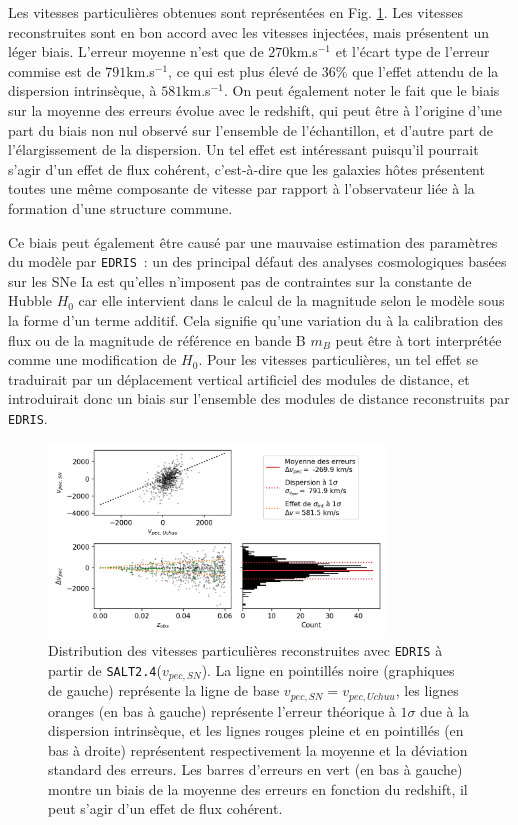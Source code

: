 \documentclass{book}
\def\edris{\texttt{EDRIS}\xspace}
\def\saltd{\texttt{SALT2.4}\xspace}
\begin{document}
Les vitesses particulières obtenues sont représentées en Fig. \ref{fig:vp_salt}. Les vitesses reconstruites sont en bon accord avec les vitesses injectées, mais présentent un léger biais. L'erreur moyenne n'est que de $270$km.s$^{-1}$ et l'écart type de l'erreur commise est de $791$km.s$^{-1}$, ce qui est plus élevé de 36\% que l'effet attendu de la dispersion intrinsèque, à $581$km.s$^{-1}$. On peut également noter le fait que le biais sur la moyenne des erreurs évolue avec le redshift, qui peut être à l'origine d'une part du biais non nul observé sur l'ensemble de l'échantillon, et d'autre part de l'élargissement de la dispersion. Un tel effet est intéressant puisqu'il pourrait s'agir d'un effet de flux cohérent, c'est-à-dire que les galaxies hôtes présentent toutes une même composante de vitesse par rapport à l'observateur liée à la formation d'une structure commune.

Ce biais peut également être causé par une mauvaise estimation des paramètres du modèle par \edris~: un des principal défaut des analyses cosmologiques basées sur les SNe Ia est qu'elles n'imposent pas de contraintes sur la constante de Hubble $H_0$ car elle intervient dans le calcul de la magnitude selon le modèle sous la forme d'un terme additif. Cela signifie qu'une variation du à la calibration des flux ou de la magnitude de référence en bande B $m_B$ peut être à tort interprétée comme une modification de $H_0$. Pour les vitesses particulières, un tel effet se traduirait par un déplacement vertical artificiel des modules de distance, et introduirait donc un biais sur l'ensemble des modules de distance reconstruits par \edris.

\begin{figure}
	\centering
	\includegraphics[width=0.8\textwidth]{figures/vp_salt.png}
	\caption{Distribution des vitesses particulières reconstruites avec \edris à partir de \saltd ($v_{pec,SN}$). La ligne en pointillés noire (graphiques de gauche) représente la ligne de base $v_{pec, SN} = v_{pec, Uchuu}$, les lignes oranges (en bas à gauche) représente l'erreur théorique à $1\sigma$ due à la dispersion intrinsèque, et les lignes rouges pleine et en pointillés (en bas à droite) représentent respectivement la moyenne et la déviation standard des erreurs. Les barres d'erreurs en vert (en bas à gauche) montre un biais de la moyenne des erreurs en fonction du redshift, il peut s'agir d'un effet de flux cohérent.}
	\label{fig:vp_salt}
\end{figure}
\end{document}
